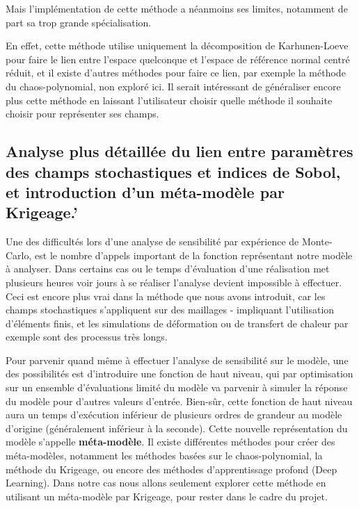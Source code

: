 \documentclass[a4paper,10pt]{article}
\begin{document}
Mais l'implémentation de cette méthode a néanmoins ses limites, notamment de part sa trop grande spécialisation. \par \bigskip

En effet, cette méthode utilise uniquement la décomposition de Karhunen-Loeve pour faire le lien entre l'espace quelconque et l'espace de référence normal centré réduit, et il existe d'autres méthodes pour faire ce lien, par exemple la méthode du chaos-polynomial, non exploré ici. Il serait intéressant de généraliser encore plus cette méthode en laissant l'utilisateur choisir quelle méthode il souhaite choisir pour représenter ses champs.

\subsection{Analyse plus détaillée du lien entre paramètres des champs stochastiques et indices de Sobol, et introduction d'un méta-modèle par Krigeage.'}
	
	Une des difficultés lors d'une analyse de sensibilité par expérience de Monte-Carlo, est le nombre d'appels important de la fonction représentant notre modèle à analyser. Dans certains cas ou le temps d'évaluation d'une réalisation met plusieurs heures voir jours à se réaliser l'analyse devient impossible à effectuer. Ceci est encore plus vrai dans la méthode que nous avons introduit, car les champs stochastiques s'appliquent sur des maillages - impliquant l'utilisation d'éléments finis, et les simulations de déformation ou de transfert de chaleur par exemple sont des processus très longs. \par \smallskip
	
	Pour parvenir quand même à effectuer l'analyse de sensibilité sur le modèle, une des possibilités est d'introduire une fonction de haut niveau, qui par optimisation sur un ensemble d'évaluations limité du modèle va parvenir à simuler la réponse du modèle pour d'autres valeurs d'entrée. Bien-sûr, cette fonction de haut niveau aura un temps d’exécution inférieur de plusieurs ordres de grandeur au modèle d'origine (généralement inférieur à la seconde). Cette nouvelle représentation du modèle s’appelle \textbf{méta-modèle}. Il existe différentes méthodes pour créer des méta-modèles, notamment les méthodes basées sur le chaos-polynomial, la méthode du Krigeage, ou encore des méthodes d'apprentissage profond (Deep Learning). Dans notre cas nous allons seulement explorer cette méthode en utilisant un méta-modèle par Krigeage, pour rester dans le cadre du projet. \par \smallskip
	
\end{document}
